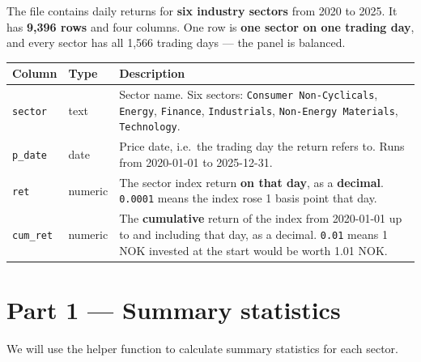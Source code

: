 \documentclass[
  12pt,
  a4paper,
]{scrbook}
\newcounter{none} %
\theoremstyle{plain}
\theoremstyle{definition}
\theoremstyle{remark}
\begin{document}
The file contains daily returns for \textbf{six industry sectors} from
2020 to 2025. It has \textbf{9,396 rows} and four columns. One row is
\textbf{one sector on one trading day}, and every sector has all 1,566
trading days --- the panel is balanced.


{\def\LTcaptype{none} %
\begin{longtable}[]{@{}
  >{\raggedright\arraybackslash}p{}
  >{\raggedright\arraybackslash}p{}
  >{\raggedright\arraybackslash}p{}@{}}
\toprule\noalign{}
\begin{minipage}[b]{\linewidth}\raggedright
Column
\end{minipage} & \begin{minipage}[b]{\linewidth}\raggedright
Type
\end{minipage} & \begin{minipage}[b]{\linewidth}\raggedright
Description
\end{minipage} \\
\midrule\noalign{}
\endhead
\bottomrule\noalign{}
\endlastfoot
\texttt{sector} & text & Sector name. Six sectors:
\texttt{Consumer\ Non-Cyclicals}, \texttt{Energy}, \texttt{Finance},
\texttt{Industrials}, \texttt{Non-Energy\ Materials},
\texttt{Technology}. \\
\texttt{p\_date} & date & Price date, i.e.~the trading day the return
refers to. Runs from 2020-01-01 to 2025-12-31. \\
\texttt{ret} & numeric & The sector index return \textbf{on that day},
as a \textbf{decimal}. \texttt{0.0001} means the index rose 1 basis
point that day. \\
\texttt{cum\_ret} & numeric & The \textbf{cumulative} return of the
index from 2020-01-01 up to and including that day, as a decimal.
\texttt{0.01} means 1 NOK invested at the start would be worth 1.01
NOK. \\
\end{longtable}
}

\section{Part 1 --- Summary statistics}\label{part-1-summary-statistics}

We will use the helper function to calculate summary statistics for each
sector.
\end{document}

